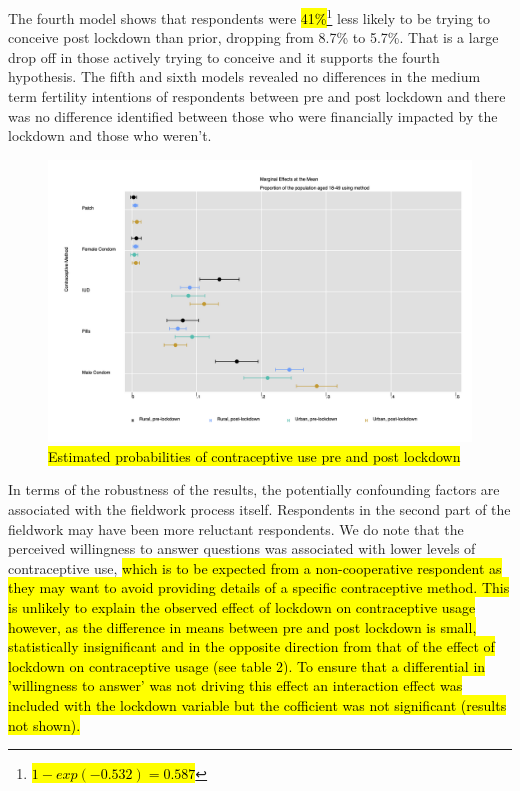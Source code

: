 \documentclass[10pt,letterpaper]{article}
\begin{document}
The fourth model shows that respondents were \hl{41\%}\footnote{\hl{$1 - exp(-0.532) = 0.587$}} less likely to be trying to conceive post lockdown than prior, dropping from 8.7\% to 5.7\%. That is a large drop off in those actively trying to conceive and it supports the fourth hypothesis. The fifth and sixth models revealed no differences in the medium term fertility intentions of respondents between pre and post lockdown and there was no difference identified between those who were financially impacted by the lockdown and those who weren't. 

\begin{figure}
\centering
\includegraphics[width=\textwidth]{fig4.png}
\caption{\hl{Estimated probabilities of contraceptive use pre and post lockdown}}
\label{fig:marginal}
\end{figure}

In terms of the robustness of the results, the potentially confounding factors are associated with the fieldwork process itself. Respondents in the second part of the fieldwork may have been more reluctant respondents. We do note that the perceived willingness to answer questions was associated with lower levels of contraceptive use, \hl{which is to be expected from a non-cooperative respondent as they may want to avoid providing details of a specific contraceptive method. This is unlikely to explain the observed effect of lockdown on contraceptive usage however, as the difference in means between pre and post lockdown is small, statistically insignificant and in the opposite direction from that of the effect of lockdown on contraceptive usage (see table 2). To ensure that a differential in 'willingness to answer' was not driving this effect an interaction effect was included with the lockdown variable but the cofficient was not significant (results not shown).}
\end{document}
